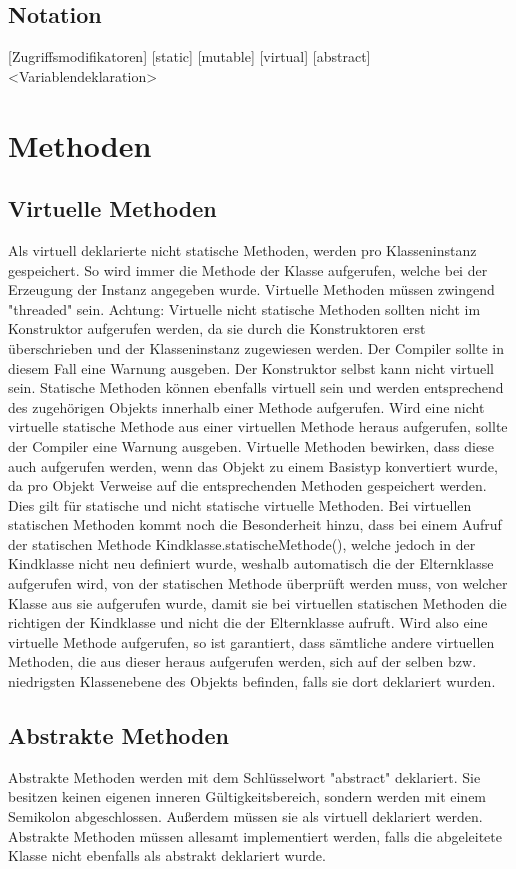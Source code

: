 \subsection{Notation}
[Zugriffsmodifikatoren] [static] [mutable] [virtual] [abstract] <Variablendeklaration>

\section{Methoden}

\subsection{Virtuelle Methoden}
Als virtuell deklarierte nicht statische Methoden, werden pro Klasseninstanz gespeichert.
So wird immer die Methode der Klasse aufgerufen, welche bei der Erzeugung der Instanz angegeben wurde.
Virtuelle Methoden müssen zwingend "threaded" sein.
Achtung: Virtuelle nicht statische Methoden sollten nicht im Konstruktor aufgerufen werden, da sie durch die Konstruktoren
erst überschrieben und der Klasseninstanz zugewiesen werden. Der Compiler sollte in diesem Fall eine Warnung ausgeben.
Der Konstruktor selbst kann nicht virtuell sein.
Statische Methoden können ebenfalls virtuell sein und werden entsprechend des zugehörigen Objekts innerhalb einer Methode aufgerufen.
Wird eine nicht virtuelle statische Methode aus einer virtuellen Methode heraus aufgerufen, sollte der Compiler eine Warnung ausgeben.
Virtuelle Methoden bewirken, dass diese auch aufgerufen werden, wenn das Objekt zu einem Basistyp konvertiert wurde, da pro
Objekt Verweise auf die entsprechenden Methoden gespeichert werden. Dies gilt für statische und nicht statische virtuelle Methoden.
Bei virtuellen statischen Methoden kommt noch die Besonderheit hinzu, dass bei einem Aufruf der statischen Methode Kindklasse.statischeMethode(),
welche jedoch in der Kindklasse nicht neu definiert wurde, weshalb automatisch die der Elternklasse aufgerufen wird, von der statischen Methode
überprüft werden muss, von welcher Klasse aus sie aufgerufen wurde, damit sie bei virtuellen statischen Methoden die richtigen der Kindklasse und
nicht die der Elternklasse aufruft.
Wird also eine virtuelle Methode aufgerufen, so ist garantiert, dass sämtliche andere virtuellen Methoden, die aus dieser heraus aufgerufen werden,
sich auf der selben bzw. niedrigsten Klassenebene des Objekts befinden, falls sie dort deklariert wurden.

\subsection{Abstrakte Methoden}
Abstrakte Methoden werden mit dem Schlüsselwort "abstract" deklariert.
Sie besitzen keinen eigenen inneren Gültigkeitsbereich, sondern werden mit einem Semikolon abgeschlossen.
Außerdem müssen sie als virtuell deklariert werden.
Abstrakte Methoden müssen allesamt implementiert werden, falls die abgeleitete Klasse nicht ebenfalls als abstrakt deklariert wurde.

